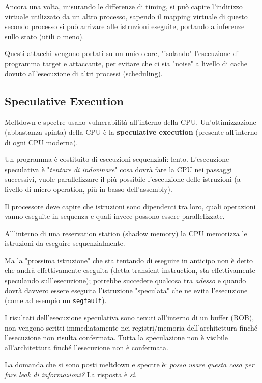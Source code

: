 Ancora una volta, misurando le differenze di timing, si può capire l'indirizzo virtuale utilizzato da un altro processo, sapendo il mapping virtuale di questo secondo processo si può arrivare alle istruzioni eseguite, portando a inferenze sullo stato (utili o meno).

Questi attacchi vengono portati su un unico core, "isolando" l'esecuzione di programma target e attaccante, per evitare che ci sia "noise" a livello di cache dovuto all'esecuzione di altri processi (scheduling).

\subsection{Speculative Execution}

Meltdown e spectre usano vulnerabilità all'interno della CPU. Un'ottimizzazione (abbastanza spinta) della CPU è la \textbf{speculative execution} (presente all'interno di ogni CPU moderna). 

Un programma è costituito di esecuzioni sequenziali: lento. L'esecuzione speculativa è "\textit{tentare di indovinare}" cosa dovrà fare la CPU nei passaggi successivi, vuole parallelizzare il più possibile l'esecuzione delle istruzioni (a livello di micro-operation, più in basso dell'assembly).

Il processore deve capire che istruzioni sono dipendenti tra loro, quali operazioni vanno eseguite in sequenza e quali invece possono essere parallelizzate.

All'interno di una reservation station (shadow memory) la CPU memorizza le istruzioni da eseguire sequenzialmente. 

Ma la "prossima istruzione" che sta tentando di eseguire in anticipo non è detto che andrà effettivamente eseguita (detta transient instruction, sta effettivamente speculando sull'esecuzione); potrebbe succedere qualcosa tra \textit{adesso} e quando dovrà davvero essere eseguita l'istruzione "speculata" che ne evita l'esecuzione (come ad esempio un \texttt{segfault}).

I risultati dell'esecuzione speculativa sono tenuti all'interno di un buffer (ROB), non vengono scritti immediatamente nei registri/memoria dell'architettura finché l'esecuzione non risulta confermata. Tutta la speculazione non è visibile all'architettura finché l'esecuzione non è confermata.

La domanda che si sono posti meltdown e spectre è: \textit{posso usare questa cosa per fare leak di informazioni?} La risposta è \textit{sì}.

